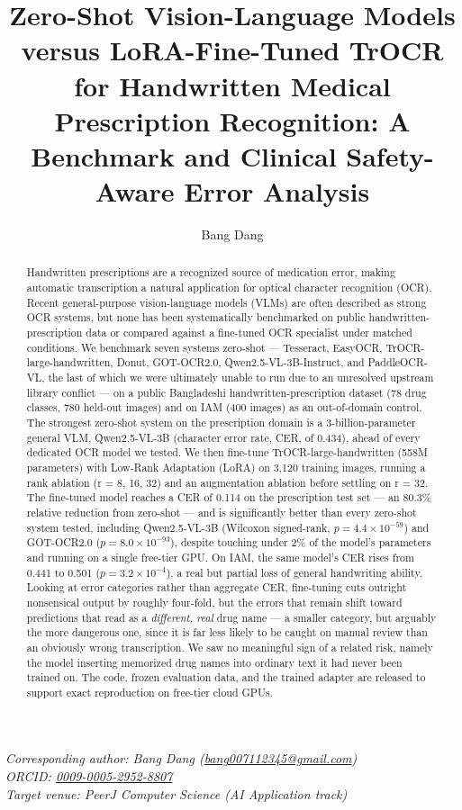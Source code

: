 \documentclass[12pt]{article}
\title{\Large Zero-Shot Vision-Language Models versus LoRA-Fine-Tuned TrOCR for Handwritten Medical Prescription Recognition: A Benchmark and Clinical Safety-Aware Error Analysis}
\author[1]{Bang Dang}
\affil[1]{Independent Researcher}
\date{}
\begin{document}
\linenumbers
\RaggedRight

\maketitle

\begin{center}
\textit{Corresponding author: Bang Dang (\href{mailto:bang007112345@gmail.com}{bang007112345@gmail.com})}\\[2pt]
\textit{ORCID: \href{https://orcid.org/0009-0005-2952-8807}{0009-0005-2952-8807}}\\[2pt]
\textit{Target venue: PeerJ Computer Science (AI Application track)}
\end{center}

\begin{abstract}
Handwritten prescriptions are a recognized source of medication error, making automatic transcription
a natural application for optical character recognition (OCR). Recent general-purpose vision-language
models (VLMs) are often described as strong OCR systems, but none has been systematically benchmarked on
public handwritten-prescription data or compared against a fine-tuned OCR specialist under matched
conditions. We benchmark seven systems zero-shot --- Tesseract, EasyOCR, TrOCR-large-handwritten, Donut,
GOT-OCR2.0, Qwen2.5-VL-3B-Instruct, and PaddleOCR-VL, the last of which we were ultimately unable to run due
to an unresolved upstream library conflict --- on a public Bangladeshi handwritten-prescription dataset
(78 drug classes, 780 held-out images) and on IAM (400 images) as an out-of-domain control. The strongest
zero-shot system on the prescription domain is a 3-billion-parameter general VLM, Qwen2.5-VL-3B
(character error rate, CER, of 0.434), ahead of every dedicated OCR model we tested. We then fine-tune
TrOCR-large-handwritten (558M parameters) with Low-Rank Adaptation (LoRA) on 3{,}120 training images,
running a rank ablation (r = 8, 16, 32) and an augmentation ablation before settling on r = 32. The
fine-tuned model reaches a CER of 0.114 on the prescription test set --- an 80.3\% relative reduction from
zero-shot --- and is significantly better than every zero-shot system tested, including Qwen2.5-VL-3B
(Wilcoxon signed-rank, $p = 4.4\times10^{-59}$) and GOT-OCR2.0 ($p = 8.0\times10^{-93}$), despite touching
under 2\% of the model's parameters and running on a single free-tier GPU. On IAM, the same model's CER
rises from 0.441 to 0.501 ($p = 3.2\times10^{-4}$), a real but partial loss of general handwriting ability.
Looking at error categories rather than aggregate CER, fine-tuning cuts outright nonsensical output
by roughly four-fold, but the errors that remain shift toward predictions that read as a \textit{different,
real} drug name --- a smaller category, but arguably the more dangerous one, since it is far less likely to
be caught on manual review than an obviously wrong transcription. We saw no meaningful sign of a related
risk, namely the model inserting memorized drug names into ordinary text it had never been trained on. The
code, frozen evaluation data, and the trained adapter are released to support exact reproduction on free-tier
cloud GPUs.


\end{abstract}
\end{document}
